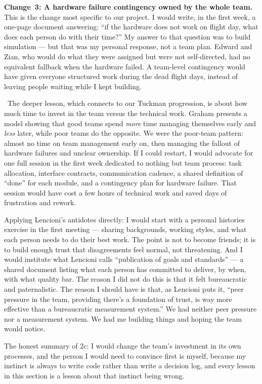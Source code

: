 \textbf{Change~3: A hardware failure contingency owned by the whole team.} This is the change most specific to our project. I would write, in the first week, a one-page document answering: ``if the hardware does not work on flight day, what does each person do with their time?'' My answer to that question was to build simulation --- but that was my personal response, not a team plan. Edward and Zian, who would do what they were assigned but were not self-directed, had no equivalent fallback when the hardware failed. A team-level contingency would have given everyone structured work during the dead flight days, instead of leaving people waiting while I kept building.

\ebi\ The deeper lesson, which connects to our Tuckman progression, is about how much time to invest in the team versus the technical work. Graham presents a model showing that good teams spend \textit{more} time managing themselves early and \textit{less} later, while poor teams do the opposite. We were the poor-team pattern: almost no time on team management early on, then managing the fallout of hardware failures and unclear ownership. If I could restart, I would advocate for one full session in the first week dedicated to nothing but team process: task allocation, interface contracts, communication cadence, a shared definition of ``done'' for each module, and a contingency plan for hardware failure. That session would have cost a few hours of technical work and saved days of frustration and rework.

Applying Lencioni's antidotes directly: I would start with a personal histories exercise in the first meeting --- sharing backgrounds, working styles, and what each person needs to do their best work. The point is not to become friends; it is to build enough trust that disagreements feel normal, not threatening. And I would institute what Lencioni calls ``publication of goals and standards'' --- a shared document listing what each person has committed to deliver, by when, with what quality bar. The reason I did not do this is that it felt bureaucratic and paternalistic. The reason I should have is that, as Lencioni puts it, ``peer pressure in the team, providing there's a foundation of trust, is way more effective than a bureaucratic measurement system.'' We had neither peer pressure nor a measurement system. We had me building things and hoping the team would notice.

The honest summary of 2c: I would change the team's investment in its own processes, and the person I would need to convince first is myself, because my instinct is always to write code rather than write a decision log, and every lesson in this section is a lesson about that instinct being wrong.

